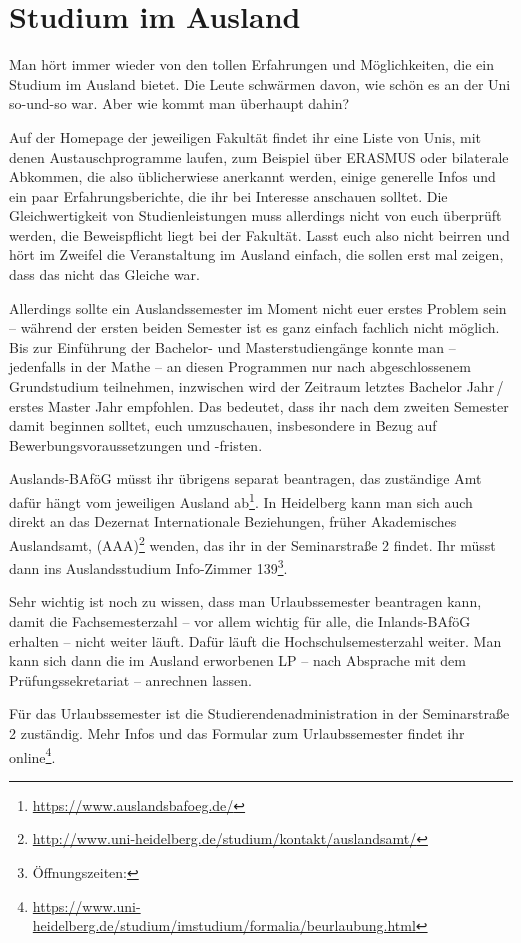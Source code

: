\section{Studium im Ausland}
Man hört immer wieder von den tollen Erfahrungen und Möglichkeiten, die ein Studium im Ausland bietet. Die Leute schwärmen davon, wie schön es an der Uni so-und-so war. Aber wie kommt man überhaupt dahin?

Auf der Homepage der jeweiligen Fakultät findet ihr eine Liste von Unis, mit denen Austauschprogramme laufen, zum Beispiel über ERASMUS oder bilaterale Abkommen, die also üblicherwiese anerkannt werden, einige generelle Infos und ein paar Erfahrungsberichte, die ihr bei Interesse anschauen solltet. Die Gleichwertigkeit von Studienleistungen muss allerdings nicht von euch überprüft werden, die Beweispflicht liegt bei der Fakultät. Lasst euch also nicht beirren und hört im Zweifel die Veranstaltung im Ausland einfach, die sollen erst mal zeigen, dass das nicht das Gleiche war.

Allerdings sollte ein Auslandssemester im Moment nicht euer erstes Problem sein -- während der ersten beiden Semester ist es ganz einfach fachlich nicht möglich. Bis zur Einführung der Bachelor- und Masterstudiengänge konnte man -- jedenfalls in der Mathe -- an diesen Programmen nur nach abgeschlossenem Grundstudium teilnehmen, inzwischen wird der Zeitraum letztes Bachelor Jahr\,/\,erstes Master Jahr empfohlen. Das bedeutet, dass ihr nach dem zweiten Semester damit beginnen solltet, euch umzuschauen, insbesondere in Bezug auf Bewerbungsvoraussetzungen und -fristen.

Auslands-BAföG müsst ihr übrigens separat beantragen, das zu\-stän\-dige Amt dafür hängt vom jeweiligen Ausland ab\footnote{\url{https://www.auslandsbafoeg.de/}}. In Heidelberg kann man sich auch direkt an das Dezernat Internationale Beziehungen, früher Akademisches Auslandsamt, (AAA)\footnote{\url{http://www.uni-heidelberg.de/studium/kontakt/auslandsamt/}} wenden, das ihr in der Seminarstraße 2 findet. Ihr müsst dann ins Auslandsstudium Info-Zimmer 139\footnote{Öffnungszeiten: \auslandsinfooeff}.

Sehr wichtig ist noch zu wissen, dass man Urlaubssemester beantragen kann, damit die Fachsemesterzahl -- vor allem wichtig für alle, die Inlands-BAföG erhalten -- nicht weiter läuft. Dafür läuft die Hochschulsemesterzahl weiter. Man kann sich dann die im Ausland erworbenen \gls{LP} -- nach Absprache mit dem Prüfungssekretariat -- anrechnen lassen.

Für das Urlaubssemester ist die Studierendenadministration in der Seminarstraße 2 zuständig. Mehr Infos und das Formular zum Urlaubssemester findet ihr online\footnote{\url{https://www.uni-heidelberg.de/studium/imstudium/formalia/beurlaubung.html}}.


